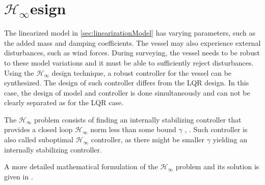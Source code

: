 \section{\texorpdfstring{$\mathcal{H}_\infty$} Design}
The linearized model in \autoref{sec:linearizationModel} has varying parameters, such as the added mass and damping coefficients. The vessel may also experience external disturbances, such as wind forces. During surveying, the vessel needs to be robust to these model variations and it must be able to sufficiently reject disturbances. Using the $\mathcal{H}_\infty$ design technique, a robust controller for the vessel can be synthesized. The design of such controller differs from the LQR design. In this case, the design of model and controller is done simultaneously and can not be clearly separated as for the LQR case.

The $\mathcal{H}_\infty$ problem consists of finding an internally stabilizing controller that provides a closed loop $\mathcal{H}_\infty$ norm less than some bound $\gamma$ \cite[p. 835]{JCDoyle}, \cite[pp. 92-93]{AAStoorvogel}. Such controller is also called suboptimal $\mathcal{H}_\infty$ controller, as there might be smaller $\gamma$ yielding an internally stabilizing controller.%

A more detailed mathematical formulation of the $\mathcal{H}_\infty$ problem and its solution is given in \cite[pp. 91-119]{AAStoorvogel}. 

